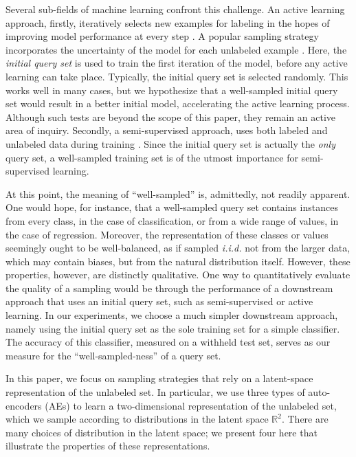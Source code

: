 \documentclass[a4paper]{article}
\begin{document}
Several sub-fields of machine learning confront this challenge. An active
learning approach, firstly, iteratively selects new examples for labeling in the
hopes of improving model performance at every step \cite{settles_active_2012}. A
popular sampling strategy incorporates the uncertainty of the model for each
unlabeled example \cite{settles_active_2012, lewis_sequential_1994}. Here, the
\emph{initial query set} is used to train the first iteration of the model,
before any active learning can take place. Typically, the initial query set is
selected randomly. This works well in many cases, but we hypothesize that a
well-sampled initial query set would result in a better initial model,
accelerating the active learning process. Although such tests are beyond the
scope of this paper, they remain an active area of inquiry. Secondly, a
semi-supervised approach, uses both labeled and unlabeled data during training
\cite{zhu_semi-supervised_2005}. Since the initial query set is actually the
\emph{only} query set, a well-sampled training set is of the utmost importance
for semi-supervised learning.

At this point, the meaning of ``well-sampled'' is, admittedly, not readily
apparent. One would hope, for instance, that a well-sampled query set contains
instances from every class, in the case of classification, or from a wide range
of values, in the case of regression. Moreover, the representation of these
classes or values seemingly ought to be well-balanced, as if sampled
\emph{i.i.d.} not from the larger data, which may contain biases, but from the
natural distribution itself. However, these properties, however, are distinctly
qualitative. One way to quantitatively evaluate the quality of a sampling would
be through the performance of a downstream approach that uses an initial query
set, such as semi-supervised or active learning. In our experiments, we choose a
much simpler downstream approach, namely using the initial query set as the sole
training set for a simple classifier. The accuracy of this classifier, measured
on a withheld test set, serves as our measure for the ``well-sampled-ness'' of a
query set.

In this paper, we focus on sampling strategies that rely on a latent-space
representation of the unlabeled set. In particular, we use three types of
auto-encoders (AEs) to learn a two-dimensional representation of the unlabeled
set, which we sample according to distributions in the latent space
$\mathbb{R}^2$. There are many choices of distribution in the latent space; we
present four here that illustrate the properties of these representations.
\end{document}
